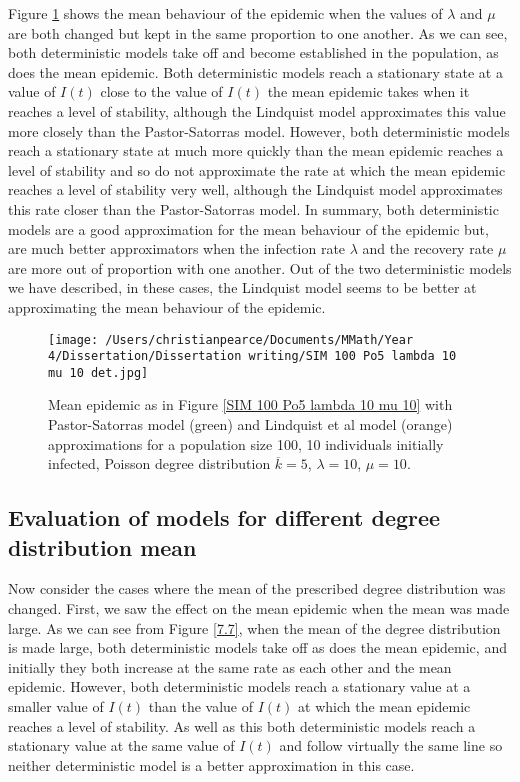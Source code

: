 \documentclass{uonmathsreport}
\begin{document}
Figure \ref{7.6} shows the mean behaviour of the epidemic when the values of $\lambda$ and $\mu$ are both changed but kept in the same proportion to one another. As we can see, both deterministic models take off and become established in the population, as does the mean epidemic. Both deterministic models reach a stationary state at a value of $I(t)$ close to the value of $I(t)$ the mean epidemic takes when it reaches a level of stability, although the Lindquist model approximates this value more closely than the Pastor-Satorras model. However, both deterministic models reach a stationary state at much more quickly than the mean epidemic reaches a level of stability and so do not approximate the rate at which the mean epidemic reaches a level of stability very well, although the Lindquist model approximates this rate closer than the Pastor-Satorras model. In summary, both deterministic models are a good approximation for the mean behaviour of the epidemic but, are much better approximators when the infection rate $\lambda$ and the recovery rate $\mu$ are more out of proportion with one another. Out of the two deterministic models we have described, in these cases, the Lindquist model seems to be better at approximating the mean behaviour of the epidemic.

\begin{figure}
\begin{center}
\texttt{[image: /Users/christianpearce/Documents/MMath/Year 4/Dissertation/Dissertation writing/SIM 100 Po5 lambda 10 mu 10 det.jpg]}
\end{center}
\caption{Mean epidemic as in Figure \ref{SIM 100 Po5 lambda 10 mu 10} with Pastor-Satorras model (green) and Lindquist et al model (orange) approximations for a population size 100, 10 individuals initially infected, Poisson degree distribution $\overline{k}=5$, $\lambda=10$, $\mu=10$.}
\label{7.6}
\end{figure}

\subsection{Evaluation of models for different degree distribution mean} \label{subsec:7.3}

Now consider the cases where the mean of the prescribed degree distribution was changed. First, we saw the effect on the mean epidemic when the mean was made large. As we can see from Figure \ref{7.7}, when the mean of the degree distribution is made large, both deterministic models take off as does the mean epidemic, and initially they both increase at the same rate as each other and the mean epidemic. However, both deterministic models reach a stationary value at a smaller value of $I(t)$ than the value of $I(t)$ at which the mean epidemic reaches a level of stability. As well as this both deterministic models reach a stationary value at the same value of $I(t)$ and follow virtually the same line so neither deterministic model is a better approximation in this case.
\end{document}
